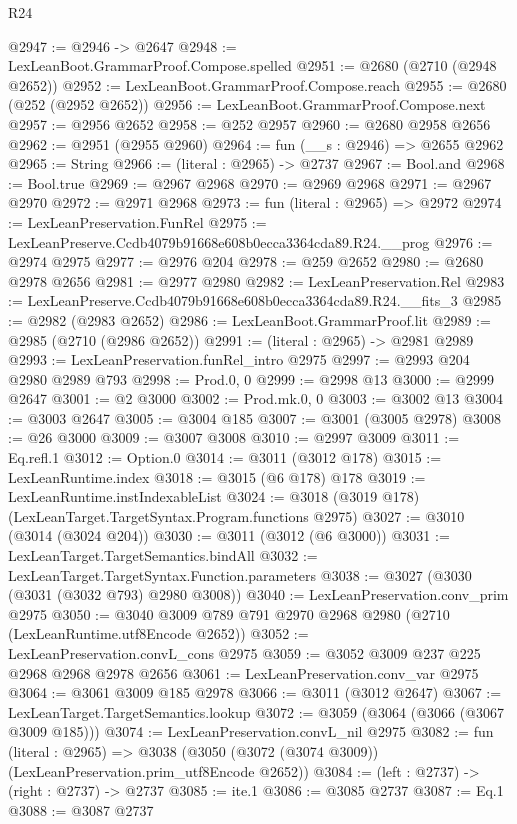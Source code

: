 \begin{lexlean}{R24}
\begin{coremodule}
@2947 := @2946 -> @2647
@2948 := LexLeanBoot.GrammarProof.Compose.spelled
@2951 := @2680 (@2710 (@2948 @2652))
@2952 := LexLeanBoot.GrammarProof.Compose.reach
@2955 := @2680 (@252 (@2952 @2652))
@2956 := LexLeanBoot.GrammarProof.Compose.next
@2957 := @2956 @2652
@2958 := @252 @2957
@2960 := @2680 @2958 @2656
@2962 := @2951 (@2955 @2960)
@2964 := fun (__s : @2946) => @2655 @2962
@2965 := String
@2966 := (literal : @2965) -> @2737
@2967 := Bool.and
@2968 := Bool.true
@2969 := @2967 @2968
@2970 := @2969 @2968
@2971 := @2967 @2970
@2972 := @2971 @2968
@2973 := fun (literal : @2965) => @2972
@2974 := LexLeanPreservation.FunRel
@2975 := LexLeanPreserve.Ccdb4079b91668e608b0ecca3364cda89.R24.__prog
@2976 := @2974 @2975
@2977 := @2976 @204
@2978 := @259 @2652
@2980 := @2680 @2978 @2656
@2981 := @2977 @2980
@2982 := LexLeanPreservation.Rel
@2983 := LexLeanPreserve.Ccdb4079b91668e608b0ecca3364cda89.R24.__fits_3
@2985 := @2982 (@2983 @2652)
@2986 := LexLeanBoot.GrammarProof.lit
@2989 := @2985 (@2710 (@2986 @2652))
@2991 := (literal : @2965) -> @2981 @2989
@2993 := LexLeanPreservation.funRel_intro @2975
@2997 := @2993 @204 @2980 @2989 @793
@2998 := Prod.{0, 0}
@2999 := @2998 @13
@3000 := @2999 @2647
@3001 := @2 @3000
@3002 := Prod.mk.{0, 0}
@3003 := @3002 @13
@3004 := @3003 @2647
@3005 := @3004 @185
@3007 := @3001 (@3005 @2978)
@3008 := @26 @3000
@3009 := @3007 @3008
@3010 := @2997 @3009
@3011 := Eq.refl.{1}
@3012 := Option.{0}
@3014 := @3011 (@3012 @178)
@3015 := LexLeanRuntime.index
@3018 := @3015 (@6 @178) @178
@3019 := LexLeanRuntime.instIndexableList
@3024 := @3018 (@3019 @178) (LexLeanTarget.TargetSyntax.Program.functions @2975)
@3027 := @3010 (@3014 (@3024 @204))
@3030 := @3011 (@3012 (@6 @3000))
@3031 := LexLeanTarget.TargetSemantics.bindAll
@3032 := LexLeanTarget.TargetSyntax.Function.parameters
@3038 := @3027 (@3030 (@3031 (@3032 @793) @2980 @3008))
@3040 := LexLeanPreservation.conv_prim @2975
@3050 := @3040 @3009 @789 @791 @2970 @2968 @2980 (@2710 (LexLeanRuntime.utf8Encode @2652))
@3052 := LexLeanPreservation.convL_cons @2975
@3059 := @3052 @3009 @237 @225 @2968 @2968 @2978 @2656
@3061 := LexLeanPreservation.conv_var @2975
@3064 := @3061 @3009 @185 @2978
@3066 := @3011 (@3012 @2647)
@3067 := LexLeanTarget.TargetSemantics.lookup
@3072 := @3059 (@3064 (@3066 (@3067 @3009 @185)))
@3074 := LexLeanPreservation.convL_nil @2975
@3082 := fun (literal : @2965) =>
  @3038 (@3050 (@3072 (@3074 @3009)) (LexLeanPreservation.prim_utf8Encode @2652))
@3084 := (left : @2737) -> (right : @2737) -> @2737
@3085 := ite.{1}
@3086 := @3085 @2737
@3087 := Eq.{1}
@3088 := @3087 @2737

\end{coremodule}
\end{lexlean}
